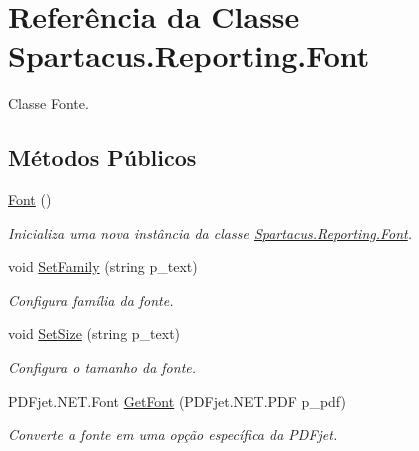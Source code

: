 \hypertarget{classSpartacus_1_1Reporting_1_1Font}{\section{Referência da Classe Spartacus.\+Reporting.\+Font}
\label{classSpartacus_1_1Reporting_1_1Font}
}


Classe Fonte.  


\subsection*{Métodos Públicos}
\begin{DoxyCompactItemize}
\item 
\hyperlink{classSpartacus_1_1Reporting_1_1Font_adcdf2ab249f34e3c8c6ba877629d1cb6}{Font} ()
\begin{DoxyCompactList}\small\item\em Inicializa uma nova instância da classe \hyperlink{classSpartacus_1_1Reporting_1_1Font}{Spartacus.\+Reporting.\+Font}. \end{DoxyCompactList}\item 
void \hyperlink{classSpartacus_1_1Reporting_1_1Font_ad89011343fb2395365c5af0b91db1bd3}{Set\+Family} (string p\+\_\+text)
\begin{DoxyCompactList}\small\item\em Configura família da fonte. \end{DoxyCompactList}\item 
void \hyperlink{classSpartacus_1_1Reporting_1_1Font_ab367c7dc3470b8fc0e8f29bd2cd89a70}{Set\+Size} (string p\+\_\+text)
\begin{DoxyCompactList}\small\item\em Configura o tamanho da fonte. \end{DoxyCompactList}\item 
P\+D\+Fjet.\+N\+E\+T.\+Font \hyperlink{classSpartacus_1_1Reporting_1_1Font_a0ac6a04b95bba4e08efa07a1d26f3b08}{Get\+Font} (P\+D\+Fjet.\+N\+E\+T.\+P\+D\+F p\+\_\+pdf)
\begin{DoxyCompactList}\small\item\em Converte a fonte em uma opção específica da P\+D\+Fjet. \end{DoxyCompactList}\end{DoxyCompactItemize}
